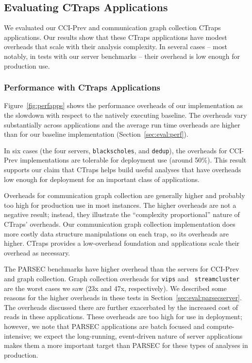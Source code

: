 \documentclass[preprint,9pt]{sigplanconf}
\newcommand{\ctraps}{CTraps\xspace}
\newcommand{\ctrapsmm}{CTraps-NRR\xspace}
\begin{document}
\subsection{Evaluating CTraps Applications}
\label{sec:appperf}
We evaluated our CCI-Prev and communication graph collection CTraps
applications.  Our results show that these CTraps applications have modest
overheads that scale with their analysis complexity.  In several cases -- most
notably, in tests with our server benchmarks -- their overhead is low enough
for production use.  

\subsubsection{Performance with \ctraps Applications}

 Figure~\ref{fig:perfapps} shows the performance overheads of
our implementation as the slowdown with respect to the natively executing
baseline.  The overheads vary substantially across applications and the average
run time overheads are higher than for our baseline implementation
(Section~\ref{sec:eval:perf}). 
  

In six cases (the four servers, {\tt blackscholes}, and {\tt dedup}), the overheads
for CCI-Prev implementations are tolerable for deployment use (around 50\%).
This result supports our claim that \ctraps helps build useful analyses that
have overheads low enough for deployment for an important class of
applications.  

Overheads for communication graph collection are generally higher and probably
too high for production use in most instances.  The higher overheads are not a
negative result; instead, they illustrate the ``complexity proportional''
nature of \ctraps' overheads.  Our communication graph collection
implementation does more costly data structure manipulations on each trap, so
its overheads are higher.  \ctraps provides a low-overhead foundation and
applications scale their overhead as necessary. 



The PARSEC benchmarks have higher overhead than the servers for CCI-Prev and
graph collection.  Graph collection overheads for {\tt vips} and {\tt
streamcluster} are the worst cases we saw (23x and 47x, respectively).  We
described some reasons for the higher overheads in these tests in
Section~\ref{sec:eval:parsecserver}.  The overheads discussed there are further
exacerbated by the increased cost of reads in these applications.  These
overheads are too high for use in deployment;  however, we note that PARSEC
applications are batch focused and compute-intensive; we expect the
long-running, event-driven nature of server applications makes them a more
important target than PARSEC for these types of analyses in production.  
\end{document}
